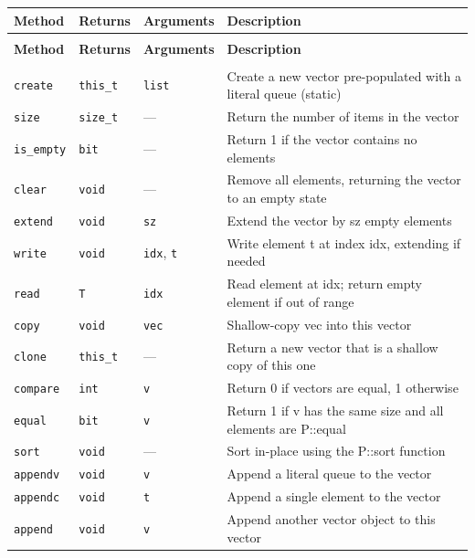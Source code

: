 \documentclass[11pt,letterpaper]{report}
\begin{document}
\begin{xltabular}{\linewidth}{>{\small}p{1.35in} >{\small}p{1.25in} >{\small}p{0.95in} >{\small}X}
\toprule
\textbf{Method} & \textbf{Returns} & \textbf{Arguments} & \textbf{Description} \\
\midrule
\endfirsthead
{} \\
\midrule
\textbf{Method} & \textbf{Returns} & \textbf{Arguments} & \textbf{Description} \\
\midrule
\endhead
\midrule
{} \\
\endfoot
\bottomrule
\endlastfoot
\texttt{create} & \texttt{this\_t} & \texttt{list} & Create a new vector pre-populated with a literal queue (static) \\
\texttt{size} & \texttt{size\_t} & --- & Return the number of items in the vector \\
\texttt{is\_empty} & \texttt{bit} & --- & Return 1 if the vector contains no elements \\
\texttt{clear} & \texttt{void} & --- & Remove all elements, returning the vector to an empty state \\
\texttt{extend} & \texttt{void} & \texttt{sz} & Extend the vector by sz empty elements \\
\texttt{write} & \texttt{void} & \texttt{idx}, \texttt{t} & Write element t at index idx, extending if needed \\
\texttt{read} & \texttt{T} & \texttt{idx} & Read element at idx; return empty element if out of range \\
\texttt{copy} & \texttt{void} & \texttt{vec} & Shallow-copy vec into this vector \\
\texttt{clone} & \texttt{this\_t} & --- & Return a new vector that is a shallow copy of this one \\
\texttt{compare} & \texttt{int} & \texttt{v} & Return 0 if vectors are equal, 1 otherwise \\
\texttt{equal} & \texttt{bit} & \texttt{v} & Return 1 if v has the same size and all elements are P::equal \\
\texttt{sort} & \texttt{void} & --- & Sort in-place using the P::sort function \\
\texttt{appendv} & \texttt{void} & \texttt{v} & Append a literal queue to the vector \\
\texttt{appendc} & \texttt{void} & \texttt{t} & Append a single element to the vector \\
\texttt{append} & \texttt{void} & \texttt{v} & Append another vector object to this vector \\
\end{xltabular}
\end{document}
